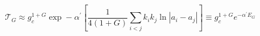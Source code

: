 \begin{equation}
\mathcal{T}_{G}\approx g_{c}^{1+G}\exp -\alpha ^{\prime }[\frac{1}{4(1+G)}%
\underset{i<j}{\sum }k_{i}k_{j}\ln \left\vert a_{i}-a_{j}\right\vert ]\equiv
g_{c}^{1+G}e^{-\alpha ^{\prime }E_{G}}
\end{equation}%
